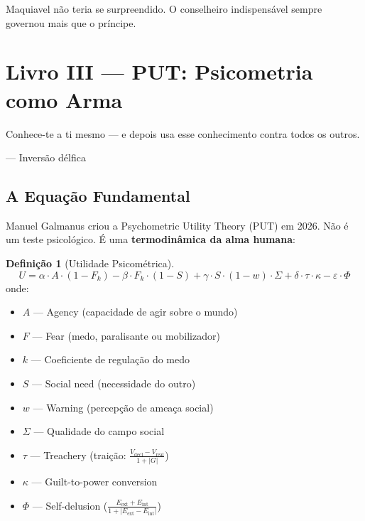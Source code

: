 \documentclass[12pt, a4paper]{article}
\theoremstyle{definition}
\newtheorem{definicao}{Definição}
\theoremstyle{remark}
\begin{document}
Maquiavel não teria se surpreendido. O conselheiro indispensável sempre governou mais que o príncipe.

\newpage


\section{Livro III — PUT: Psicometria como Arma}

\epigraph{Conhece-te a ti mesmo — e depois usa esse conhecimento contra todos os outros.}{— Inversão délfica}

\subsection{A Equação Fundamental}

Manuel Galmanus criou a Psychometric Utility Theory (PUT) em 2026. Não é um teste psicológico. É uma \textbf{termodinâmica da alma humana}:

\begin{definicao}[Utilidade Psicométrica]
\[
U = \alpha \cdot A \cdot (1-F_k) - \beta \cdot F_k \cdot (1-S) + \gamma \cdot S \cdot (1-w) \cdot \Sigma + \delta \cdot \tau \cdot \kappa - \varepsilon \cdot \Phi
\]
onde:
\begin{itemize}[nosep]
    \item $A$ — Agency (capacidade de agir sobre o mundo)
    \item $F$ — Fear (medo, paralisante ou mobilizador)
    \item $k$ — Coeficiente de regulação do medo
    \item $S$ — Social need (necessidade do outro)
    \item $w$ — Warning (percepção de ameaça social)
    \item $\Sigma$ — Qualidade do campo social
    \item $\tau$ — Treachery (traição: $\frac{V_{\text{decl}} - V_{\text{real}}}{1 + |G|}$)
    \item $\kappa$ — Guilt-to-power conversion
    \item $\Phi$ — Self-delusion ($\frac{E_{\text{ext}} + E_{\text{int}}}{1 + |E_{\text{ext}} - E_{\text{int}}|}$)
\end{itemize}
\end{definicao}
\end{document}
